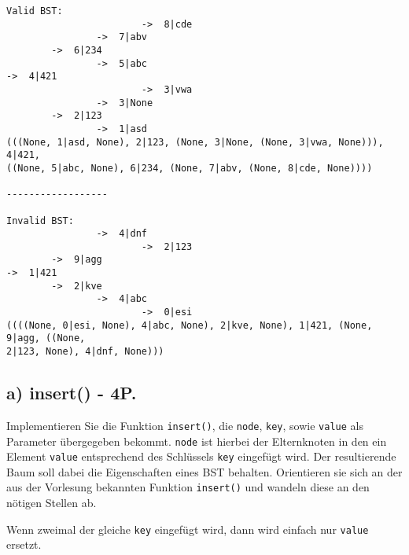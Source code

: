 \documentclass[11pt]{article}
\begin{document}
    \begin{Verbatim}[commandchars=\\\{\}]
Valid BST:
                        ->  8|cde
                ->  7|abv
        ->  6|234
                ->  5|abc
->  4|421
                        ->  3|vwa
                ->  3|None
        ->  2|123
                ->  1|asd
(((None, 1|asd, None), 2|123, (None, 3|None, (None, 3|vwa, None))), 4|421,
((None, 5|abc, None), 6|234, (None, 7|abv, (None, 8|cde, None))))

------------------

Invalid BST:
                ->  4|dnf
                        ->  2|123
        ->  9|agg
->  1|421
        ->  2|kve
                ->  4|abc
                        ->  0|esi
((((None, 0|esi, None), 4|abc, None), 2|kve, None), 1|421, (None, 9|agg, ((None,
2|123, None), 4|dnf, None)))
    \end{Verbatim}

    \hypertarget{a-insert---4p.}{%
\subsection{a) insert() - 4P.}\label{a-insert---4p.}}

Implementieren Sie die Funktion \texttt{insert()}, die \texttt{node},
\texttt{key}, sowie \texttt{value} als Parameter übergegeben bekommt.
\texttt{node} ist hierbei der Elternknoten in den ein Element
\texttt{value} entsprechend des Schlüssels \texttt{key} eingefügt wird.
Der resultierende Baum soll dabei die Eigenschaften eines BST behalten.
Orientieren sie sich an der aus der Vorlesung bekannten Funktion
\texttt{insert()} und wandeln diese an den nötigen Stellen ab.

Wenn zweimal der gleiche \texttt{key} eingefügt wird, dann wird einfach
nur \texttt{value} ersetzt.
\end{document}
